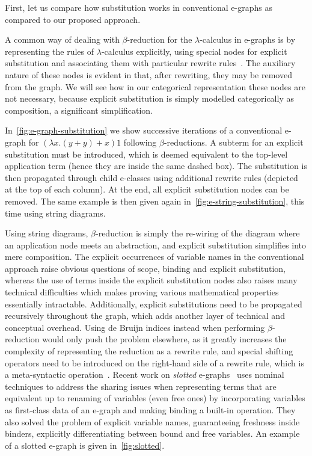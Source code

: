 First, let us compare how substitution works in conventional e-graphs as compared to our proposed approach.

A common way of dealing with $\beta$-reduction for the $\lambda$-calculus in e-graphs is by representing the rules of $\lambda$-calculus explicitly, using special nodes for explicit substitution and associating them with particular rewrite rules~\cite{EggPaper,koehler2022sketchguided}.
The auxiliary nature of these nodes is evident in that, after rewriting, they may be removed from the graph.
We will see how in our categorical representation these nodes are not necessary, because explicit substitution is simply modelled categorically as composition, a significant simplification.

In~\autoref{fig:e-graph-substitution} we show successive iterations of a conventional e-graph for $(\lambda x . (y + y) + x) 1$ following $\beta$-reductions.
A subterm for an explicit substitution must be introduced, which is deemed equivalent to the top-level application term (hence they are inside the same dashed box).
The substitution is then propagated through child e-classes using additional rewrite rules (depicted at the top of each column).
At the end, all explicit substitution nodes can be removed.
The same example is then given again in~\autoref{fig:e-string-substitution}, this time using string diagrams.

Using string diagrams, $\beta$-reduction is simply the re-wiring of the diagram where an application node meets an abstraction, and explicit substitution simplifies into mere composition.
The explicit occurrences of variable names in the conventional approach raise obvious questions of scope, binding and explicit substitution, whereas the use of terms inside the explicit substitution nodes also raises many technical difficulties which makes proving various mathematical properties essentially intractable.
Additionally, explicit substitutions need to be propagated recursively throughout the graph, which adds another layer of technical and conceptual overhead.
Using de Bruijn indices instead when performing $\beta$-reduction would only push the problem elsewhere, as it greatly increases the complexity of representing the reduction as a rewrite rule, and special shifting operators need to be introduced on the right-hand side of a rewrite rule, which is a meta-syntactic operation~\cite{koehler2022sketchguided}.
Recent work on \emph{slotted} e-graphs~\cite{slotted-egraphs} uses nominal techniques to address the sharing issues when representing terms that are equivalent up to renaming of variables (even free ones) by incorporating variables as first-class data of an e-graph and making binding a built-in operation.
They also solved the problem of explicit variable names, guaranteeing freshness inside binders, explicitly differentiating between bound and free variables.
An example of a slotted e-graph is given in~\autoref{fig:slotted}.

